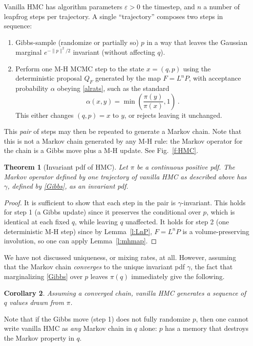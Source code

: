 \documentclass[10pt]{article}
\newcommand{\ben}{\begin{enumerate}}
\newcommand{\een}{\end{enumerate}}
\newtheorem{thm}{Theorem}
\newtheorem{cor}[thm]{Corollary}
\newcommand{\al}{\alpha}
\newcommand{\eps}{\varepsilon}
\begin{document}
Vanilla HMC has algorithm parameters $\eps>0$ the timestep, and $n$ a number of leapfrog steps per trajectory.
A single ``trajectory'' composes two steps in sequence:
\ben
\item Gibbs-sample (randomize or partially so) $p$ in a way that leaves the
  Gaussian marginal $e^{-\|p\|^2/2}$ invariant (without affecting $q$).
\item Perform one M-H MCMC step to the state $x=(q,p)$
  using the deterministic proposal $Q_F$ generated by the map $F = L^n P$,
  with acceptance probability $\al$ obeying \eqref{alrats},
  such as the standard
  $$
  \al(x,y) = \min\left(\frac{\pi(y)}{\pi(x)}, 1\right)~.
  $$
  This either changes $(q,p)=x$ to $y$, or rejects leaving it unchanged.
\een
This {\em pair} of steps may then be repeated to generate a Markov chain.
Note that this is not a Markov chain generated by any
M-H rule: the Markov operator for the chain is a Gibbs move plus a M-H update.
See Fig.~\ref{f:HMC}.

\begin{thm}[Invariant pdf of HMC]
  Let $\pi$ be a continuous positive pdf.
  The Markov operator defined by one trajectory of vanilla HMC as
  described above has $\gamma$,
  defined by \eqref{Gibbs}, as an invariant pdf.
  \label{t:hmc}
\end{thm}
\begin{proof}
  It is sufficient to show that each step in the pair is $\gamma$-invariant.
  This holds for step 1 (a Gibbs update) since it preserves the conditional
  over $p$, which is identical at each fixed $q$, while leaving $q$ unaffected.
  It holds for step 2 (one deterministic M-H step) since by
  Lemma~\ref{l:LnP}, $F=L^n P$
  is a volume-preserving involution, so one can apply Lemma~\ref{l:mhmap}.
\end{proof}

We have not discussed uniqueness, or mixing rates, at all.
However, assuming that the Markov chain {\em converges} to the
unique invariant pdf $\gamma$,
the fact that marginalizing \eqref{Gibbs} over $p$ leaves $\pi(q)$
immediately give the following.

\begin{cor}
  Assuming a converged chain,
  vanilla HMC generates a sequence of $q$ values drawn from $\pi$.
\end{cor}
Note that if the Gibbs move (step 1) does not fully randomize $p$,
then one cannot write vanilla HMC as {\em any} Markov chain in $q$ alone:
$p$ has a memory that destroys the Markov property in $q$.
\end{document}
